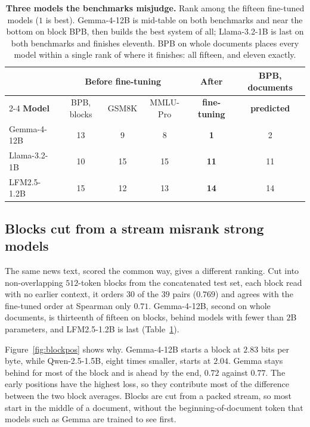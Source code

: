 \documentclass[10pt]{article}
\begin{document}
\begin{table}[t]
\centering\small
\begin{tabular}{lccccc}
\toprule
& \multicolumn{3}{c}{\textbf{Before fine-tuning}} & \textbf{After} & \textbf{BPB, documents} \\
\cmidrule(lr){2-4}
\textbf{Model} & BPB, blocks & GSM8K & MMLU-Pro & \textbf{fine-tuning} & \textbf{predicted} \\
\midrule
Gemma-4-12B & 13 & \phantom{0}9 & \phantom{0}8 & \textbf{\phantom{0}1} & \phantom{0}2 \\
Llama-3.2-1B & 10 & 15 & 15 & \textbf{11} & 11 \\
LFM2.5-1.2B & 15 & 12 & 13 & \textbf{14} & 14 \\
\bottomrule
\end{tabular}
\caption{\textbf{Three models the benchmarks misjudge.} Rank among the fifteen fine-tuned models
($1$ is best). Gemma-4-12B is mid-table on both benchmarks and near the bottom on block BPB, then
builds the best system of all; Llama-3.2-1B is last on both benchmarks and finishes eleventh. BPB on
whole documents places every model within a single rank of where it finishes: all fifteen, and
eleven exactly.}
\label{tab:outofbox}
\end{table}

\subsection{Blocks cut from a stream misrank strong models}
\label{sec:mechanism}
The same news text, scored the common way, gives a different ranking. Cut into non-overlapping
$512$-token blocks from the concatenated test set, each block read with no earlier context, it
orders $30$ of the $39$ pairs ($0.769$) and agrees with the fine-tuned order at Spearman only $0.71$.
Gemma-4-12B, second on whole documents, is thirteenth of fifteen on blocks, behind models with
fewer than $2$B parameters, and LFM2.5-1.2B is last (Table~\ref{tab:outofbox}).

Figure~\ref{fig:blockpos} shows why. Gemma-4-12B starts a block at $2.83$ bits per byte, while
Qwen-2.5-1.5B, eight times smaller, starts at $2.04$. Gemma stays behind for most of the block and
is ahead by the end, $0.72$ against $0.77$. The early positions have the highest loss, so they
contribute most of the difference between the two block averages. Blocks are cut from a packed
stream, so most start in the middle of a document, without the beginning-of-document token that
models such as Gemma are trained to see first.
\end{document}
